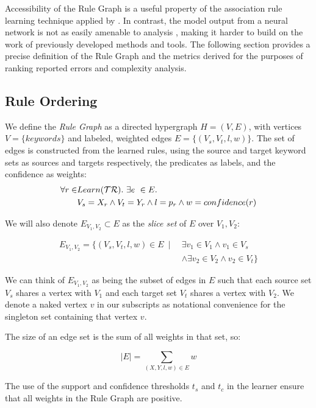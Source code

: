 Accessibility of the Rule Graph is a useful property of the association 
rule learning technique applied by \app.
In contrast, the model output from a neural network is not as easily 
amenable to analysis \cite{nnAnalysis1, nnAnalysis2}, making it harder
to build on the work of previously developed methods and tools.
The following section provides a precise definition of the Rule Graph
and the metrics derived for the purposes of ranking reported errors
and complexity analysis.

\subsection{Rule Ordering}
\label{sec:ruleorder}

We define the \textit{Rule Graph} as a directed hypergraph $H = (V,E)$,
   with vertices $V = \{ keywords \}$ and labeled, weighted edges $E = \{ (V_s, V_t, l, w) \}$.
The set of edges is constructed from the learned rules, using the source and target keyword sets as sources and targets respectively, the predicates as labels, and the confidence as weights:
%
\begin{align*}
\forall r \in & Learn(\mathcal{TR}).\ \exists e\ \in E.\\
              & V_s = X_r \land V_t=Y_r \land l=p_r \land w = confidence(r)
\end{align*}

We will also denote $E_{V_1, V_2} \subset E$ as the \textit{slice set} of $E$ over $V_1, V_2$: 

\begin{align*}
    E_{V_1, V_2} = \{ \left( V_s, V_t, l, w \right) \in E \ \mid \ & \exists v_1 \in V_1 \land v_1 \in V_s \\
    & \land \exists v_2 \in V_2 \land v_2 \in V_t \}
\end{align*}

We can think of $E_{V_1, V_2}$ as being the subset of edges in $E$ 
such that each source set $V_s$ shares a vertex with $V_1$
and each target set $V_t$ shares a vertex with $V_2$.
We denote a naked vertex $v$ in our subscripts as notational 
convenience for the singleton set containing that vertex $v$.

The size of an edge set is the sum of all weights in that set, so:

    $$|E| = \sum_{(X, Y, l, w) \in E} w$$

The use of the support and confidence thresholds $t_s$ and $t_c$ in the learner ensure 
that all weights in the Rule Graph are positive.

